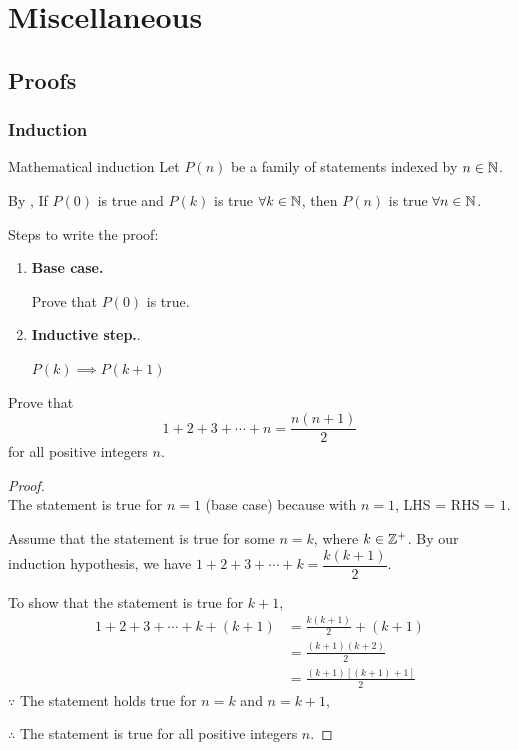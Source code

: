 \part{Miscellaneous}
\chapter{Proofs}
\section{Induction}
\begin{defn}{Mathematical induction}{}
Let $P(n)$ be a family of statements indexed by $n \in \mathbb N$.

By , If $P(0)$ is true and $P(k)$ is true $\forall k \in \mathbb N$, then $P(n)$ is true $\forall n \in \mathbb N$.\end{defn}

Steps to write the proof:
\begin{enumerate}
  \item \textbf{Base case.}
  
  Prove that $P(0)$ is true.
  \item \textbf{Inductive step.}.
  
  $P(k) \implies P(k+1)$
\end{enumerate}

\begin{exmp} Prove that \[ 1 + 2 + 3 + \cdots + n = \frac{n(n+1)}{2} \] for all positive integers $n$. \end{exmp}
\begin{proof} \ {\\}
The statement is true for $n=1$ (base case) because with $n=1$, LHS = RHS = $1$.

Assume that the statement is true for some $n=k$, where $k \in \mathbb Z^{+}$. By our induction hypothesis, we have $1 + 2 + 3 + \cdots + k = \dfrac{k(k+1)}{2}$.

To show that the statement is true for $k+1$, 
\begin{align*}
1 + 2 + 3 + \cdots + k + (k+1) &= \frac{k(k+1)}{2} + (k+1)\\
&= \frac{(k+1)(k+2)}{2}\\
&= \frac{(k+1)[(k+1)+1]}{2}
\end{align*}
$\because$ The statement holds true for $n=k$ and $n=k+1$, 

$\therefore$ The statement is true for all positive integers $n$. 
\end{proof}

